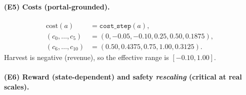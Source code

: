\documentclass[11pt]{article}
\newcommand{\code}[1]{\texttt{#1}}
\begin{document}
\paragraph{(E5) Costs (portal-grounded).}
\[
\begin{aligned}
\mathrm{cost}(a)&=\code{cost\_step}(a),\\
(c_0,\ldots,c_5)&=(0,-0.05,-0.10,0.25,0.50,0.1875),\\
(c_6,\ldots,c_{10})&=(0.50,0.4375,0.75,1.00,0.3125).
\end{aligned}
\]
Harvest is negative (revenue), so the effective range is $[-0.10,1.00]$.

\paragraph{(E6) Reward (state-dependent) and safety \emph{rescaling} (critical at real scales).}
\end{document}

